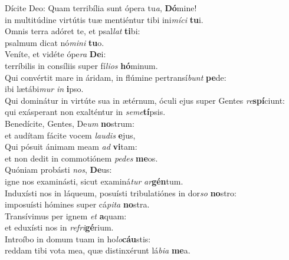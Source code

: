 \evenverse Dícite Deo: Quam terribília sunt ópera tu\textit{a}, \textbf{Dó}mine!~\*\\
\evenverse in multitúdine virtútis tuæ mentiéntur tibi ini\textit{mí}\textit{ci} \textbf{tu}i.\\
\oddverse Omnis terra adóret te, et psal\textit{lat} \textbf{ti}bi:~\*\\
\oddverse psalmum dicat nó\textit{mi}\textit{ni} \textbf{tu}o.\\
\evenverse Veníte, et vidéte ópe\textit{ra} \textbf{De}i:~\*\\
\evenverse terríbilis in consíliis super fí\textit{li}\textit{os} \textbf{hó}minum.\\
\oddverse Qui convértit mare in áridam, in flúmine pertransí\textit{bunt} \textbf{pe}de:~\*\\
\oddverse ibi lætábi\textit{mur} \textit{in} \textbf{i}pso.\\
\evenverse Qui dominátur in virtúte sua in ætérnum, óculi ejus super Gentes \textit{re}\textbf{spí}ciunt:~\*\\
\evenverse qui exásperant non exalténtur in \textit{se}\textit{me}\textbf{tí}psis.\\
\oddverse Benedícite, Gentes, De\textit{um} \textbf{no}strum:~\*\\
\oddverse et audítam fácite vocem \textit{lau}\textit{dis} \textbf{e}jus,\\
\evenverse Qui pósuit ánimam meam \textit{ad} \textbf{vi}tam:~\*\\
\evenverse et non dedit in commotiónem \textit{pe}\textit{des} \textbf{me}os.\\
\oddverse Quóniam probásti \textit{nos}, \textbf{De}us:~\*\\
\oddverse igne nos examinásti, sicut examiná\textit{tur} \textit{ar}\textbf{gén}tum.\\
\evenverse Induxísti nos in láqueum, posuísti tribulatiónes in dor\textit{so} \textbf{no}stro:~\*\\
\evenverse imposuísti hómines super cá\textit{pi}\textit{ta} \textbf{no}stra.\\
\oddverse Transívimus per ignem \textit{et} \textbf{a}quam:~\*\\
\oddverse et eduxísti nos in \textit{re}\textit{fri}\textbf{gé}rium.\\
\evenverse Introíbo in domum tuam in ho\textit{lo}\textbf{cáu}stis:~\*\\
\evenverse reddam tibi vota mea, quæ distinxérunt lá\textit{bi}\textit{a} \textbf{me}a.\\
